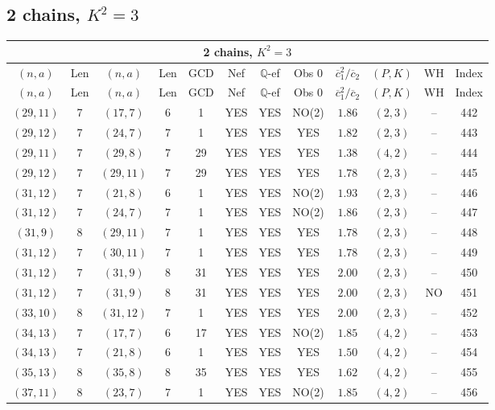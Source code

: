 \subsection{2 chains, $K^2 = 3$}
\begin{longtable}{|c|c|c|c|c|c|c|c|c|c|c|c|}
\hline
\multicolumn{12}{|c|}{2 chains, $K^2 = 3$}\\
\hline
$(n,a)$ & Len & $(n,a)$ & Len & GCD & Nef & $\mathbb Q$-ef & Obs 0 & $\overline c_1^2 / \overline c_2$ & $(P,K)$ & WH & Index\\
\hline
\endfirsthead

\hline
$(n,a)$ & Len & $(n,a)$ & Len & GCD & Nef & $\mathbb Q$-ef & Obs 0 & $\overline c_1^2 / \overline c_2$ & $(P,K)$ & WH & Index\\
\hline
\endhead
\hline
\endfoot

$(29,11)$ & 7 & $(17,7)$ & 6 & 1 & YES & YES & NO(2) & $1.86$ & $(2,3)$ & -- & 442\\
$(29,12)$ & 7 & $(24,7)$ & 7 & 1 & YES & YES & YES & $1.82$ & $(2,3)$ & -- & 443\\
$(29,11)$ & 7 & $(29,8)$ & 7 & 29 & YES & YES & YES & $1.38$ & $(4,2)$ & -- & 444\\
$(29,12)$ & 7 & $(29,11)$ & 7 & 29 & YES & YES & YES & $1.78$ & $(2,3)$ & -- & 445\\
$(31,12)$ & 7 & $(21,8)$ & 6 & 1 & YES & YES & NO(2) & $1.93$ & $(2,3)$ & -- & 446\\
$(31,12)$ & 7 & $(24,7)$ & 7 & 1 & YES & YES & NO(2) & $1.86$ & $(2,3)$ & -- & 447\\
$(31,9)$ & 8 & $(29,11)$ & 7 & 1 & YES & YES & YES & $1.78$ & $(2,3)$ & -- & 448\\
$(31,12)$ & 7 & $(30,11)$ & 7 & 1 & YES & YES & YES & $1.78$ & $(2,3)$ & -- & 449\\
$(31,12)$ & 7 & $(31,9)$ & 8 & 31 & YES & YES & YES & $2.00$ & $(2,3)$ & -- & 450\\
$(31,12)$ & 7 & $(31,9)$ & 8 & 31 & YES & YES & YES & $2.00$ & $(2,3)$ & NO & 451\\
$(33,10)$ & 8 & $(31,12)$ & 7 & 1 & YES & YES & YES & $2.00$ & $(2,3)$ & -- & 452\\
$(34,13)$ & 7 & $(17,7)$ & 6 & 17 & YES & YES & NO(2) & $1.85$ & $(4,2)$ & -- & 453\\
$(34,13)$ & 7 & $(21,8)$ & 6 & 1 & YES & YES & YES & $1.50$ & $(4,2)$ & -- & 454\\
$(35,13)$ & 8 & $(35,8)$ & 8 & 35 & YES & YES & YES & $1.62$ & $(4,2)$ & -- & 455\\
$(37,11)$ & 8 & $(23,7)$ & 7 & 1 & YES & YES & NO(2) & $1.85$ & $(4,2)$ & -- & 456\\

\end{longtable}

